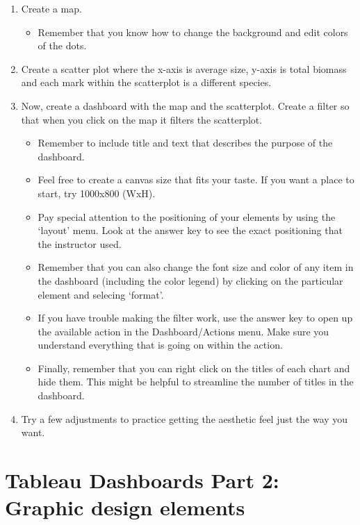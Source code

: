 \documentclass[
]{book}
\providecommand{\tightlist}{%
  \setlength{\itemsep}{0pt}\setlength{\parskip}{0pt}}
\begin{document}
\begin{enumerate}
\def\labelenumi{\arabic{enumi}.}
\tightlist
\item
  Create a map.

  \begin{itemize}
  \tightlist
  \item
    Remember that you know how to change the background and edit colors of the dots.
  \end{itemize}
\item
  Create a scatter plot where the x-axis is average size, y-axis is total biomass and each mark within the scatterplot is a different species.
\item
  Now, create a dashboard with the map and the scatterplot. Create a filter so that when you click on the map it filters the scatterplot.

  \begin{itemize}
  \tightlist
  \item
    Remember to include title and text that describes the purpose of the dashboard.
  \item
    Feel free to create a canvas size that fits your taste. If you want a place to start, try 1000x800 (WxH).
  \item
    Pay special attention to the positioning of your elements by using the `layout' menu. Look at the answer key to see the exact positioning that the instructor used.
  \item
    Remember that you can also change the font size and color of any item in the dashboard (including the color legend) by clicking on the particular element and selecing `format'.
  \item
    If you have trouble making the filter work, use the answer key to open up the available action in the Dashboard/Actions menu. Make sure you understand everything that is going on within the action.
  \item
    Finally, remember that you can right click on the titles of each chart and hide them. This might be helpful to streamline the number of titles in the dashboard.
  \end{itemize}
\item
  Try a few adjustments to practice getting the aesthetic feel just the way you want.
\end{enumerate}

\hypertarget{tableau-dashboards-part-2-graphic-design-elements}{%
\section{Tableau Dashboards Part 2: Graphic design elements}\label{tableau-dashboards-part-2-graphic-design-elements}}
\end{document}
